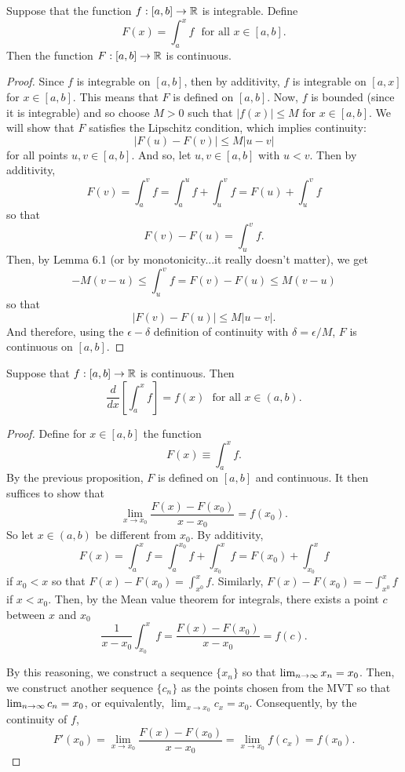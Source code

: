 \documentclass[letterpaper, twoside, 12pt]{book}
\begin{document}
\begin{proposition}[6.27]
  Suppose that the function \(f:[a,b]\to\mathbb R\) is integrable. Define
  \[
    F(x) = \int_a^x f
    \text{~~for all~} x\in[a,b]
  .\]
  Then the function \(F:[a,b]\to\mathbb R\) is continuous.
\end{proposition}

\begin{proof}
    Since \(f\) is integrable on \([a,b]\), then by additivity, 
    \(f\) is integrable on \([a,x]\) for \(x \in [a,b]\). This
    means that \(F\) is defined on \([a,b]\). Now, \(f\) is bounded
    (since it is integrable) and so choose \(M > 0\) such that
    \( |f(x)| \leq M\) for \(x \in [a,b]\). We will show that \(F\)
    satisfies the Lipschitz condition, which implies continuity:
    \[ |F(u) - F(v)|  \leq M |u - v| \]
    for all points \(u, v \in [a,b]\). And so, let \(u, v \in [a,b]\)
    with \(u < v\). Then by additivity,
    \[ F(v) = \int_a^v f = \int_a^u f + \int_u^v f = F(u) + \int_u^v f \]
    so that
    \[ F(v) - F(u) = \int_u^v f .\]
    Then, by Lemma 6.1 (or by monotonicity...it really doesn't matter), we get
    \[ -M(v - u) \leq \int_u^v f = F(v) - F(u) \leq M(v - u) \]
    so that
    \[ |F(v) - F(u)| \leq M|u - v|. \]
    And therefore, using the \(\epsilon-\delta\) definition of continuity
    with \(\delta = \epsilon/ M\), \(F\) is continuous on \([a,b]\).
\end{proof}


\begin{theorem}
  Suppose that \(f:[a,b]\to\mathbb R\) is continuous. Then
  \[
    \frac{d}{dx}\left[\int_a^x f \right]
      =
    f(x)
    \text{~~for all~} x\in(a,b)
  .\]
\end{theorem}

\begin{proof}
    Define for \(x \in [a,b]\) the function 
    \[ F(x) \equiv \int_a^x f . \]
    By the previous proposition, \(F\) is defined on \([a,b]\) and continuous.
    It then suffices to show that
    \[ \lim_{x \to x_0} \frac{F(x) - F(x_0)}{x - x_0} = f(x_0) .\]
    So let \(x \in (a,b)\) be different from \(x_0\). By additivity,
    \[ F(x) = \int_a^x f = \int_a^{x_0} f + \int_{x_0}^x f = F(x_0) + \int_{x_0}^x f \]
    if \(x_0 < x\) so that \(F(x) - F(x_0) = \int_{x^0}^x f \).
    Similarly, \(F(x) - F(x_0) = - \int_{x^0}^x f \) if \(x < x_0\). Then,
    by the Mean value theorem for integrals, there exists a point \(c\) between \(x\) and \(x_0\)
    \[ \frac{1}{x - x_0} \int_{x_0}^x f = \frac{F(x) - F(x_0)}{x - x_0} = f(c) .\]
    
    By this reasoning, we construct a sequence \(\{x_n\}\) so that \(\lim_{n \to \infty} x_n = x_0\).
    Then, we construct another sequence \(\{c_n\}\) as the points chosen from
    the MVT so that \(\lim_{n \to \infty} c_n = x_0\), or equivalently, \(\lim_{x \to x_0} c_x = x_0\).
    Consequently, by the continuity of \(f\),
    \[ F'(x_0) = \lim_{x \to x_0} \frac{F(x) - F(x_0)}{x - x_0} = \lim_{x \to x_0} f(c_x) = f(x_0) .\]
\end{proof}
\end{document}
